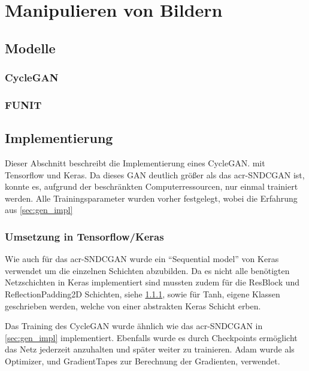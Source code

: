\chapter{Manipulieren von Bildern}\label{chp:bildmanipulation} %
\glsresetall

 \section{Modelle} %
 
\subsection{CycleGAN}%
\label{sub:cyclegan}
 
 \subsection{FUNIT}%
 
 \section{Implementierung} %
 Dieser Abschnitt beschreibt die Implementierung eines CycleGAN. mit Tensorflow und Keras. Da dieses GAN deutlich größer als das \gls{acr-SNDCGAN} ist, konnte es, aufgrund der beschränkten Computerressourcen, nur einmal trainiert werden. Alle Trainingsparameter wurden vorher festgelegt, wobei die Erfahrung aus \cref{sec:gen_impl} 
 
 \subsection{Umsetzung in Tensorflow/Keras}
 Wie auch für das \gls{acr-SNDCGAN} wurde ein \enquote{Sequential model} von Keras~\cite{keras:SequentialModel} verwendet um die einzelnen Schichten abzubilden. Da es nicht alle benötigten Netzschichten in Keras  implementiert sind mussten zudem für die ResBlock und ReflectionPadding2D Schichten, siehe \cref{sub:cyclegan}, sowie für Tanh,  eigene Klassen geschrieben werden, welche von einer abstrakten Keras Schicht erben. 
 
 Das Training des CycleGAN wurde ähnlich wie das \gls{acr-SNDCGAN} in \cref{sec:gen_impl} implementiert. Ebenfalls wurde es durch Checkpoints ermöglicht das Netz jederzeit anzuhalten und später weiter zu trainieren. Adam \cite{tf:adam} wurde als Optimizer, und GradientTapes \cite{tf:gradientape} zur Berechnung der Gradienten, verwendet.
 

